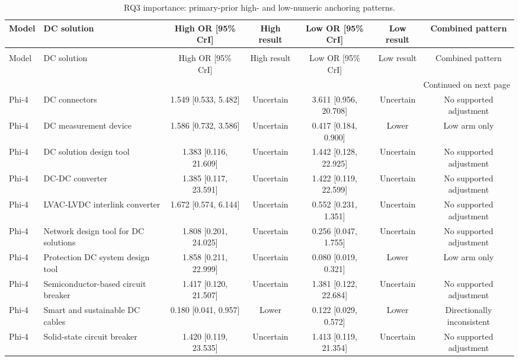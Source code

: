\begin{landscape}
\begin{longtable}{llccccc}
\caption{RQ3 importance: primary-prior high- and low-numeric anchoring patterns.} \label{tab:rq3_importance_numeric_patterns_appendix} \\
\toprule
Model & DC solution & High OR [95\% CrI] & High result & Low OR [95\% CrI] & Low result & Combined pattern \\
\midrule
\endfirsthead
\caption[]{RQ3 importance: primary-prior high- and low-numeric anchoring patterns.} \\
\toprule
Model & DC solution & High OR [95\% CrI] & High result & Low OR [95\% CrI] & Low result & Combined pattern \\
\midrule
\endhead
\midrule
\multicolumn{7}{r}{Continued on next page} \\
\midrule
\endfoot
\bottomrule
\endlastfoot
Phi-4 & DC connectors & 1.549 [0.533, 5.482] & Uncertain & 3.611 [0.956, 20.708] & Uncertain & No supported adjustment \\
Phi-4 & DC measurement device & 1.586 [0.732, 3.586] & Uncertain & 0.417 [0.184, 0.900] & Lower & Low arm only \\
Phi-4 & DC solution design tool & 1.383 [0.116, 21.609] & Uncertain & 1.442 [0.128, 22.925] & Uncertain & No supported adjustment \\
Phi-4 & DC-DC converter & 1.385 [0.117, 23.591] & Uncertain & 1.422 [0.119, 22.599] & Uncertain & No supported adjustment \\
Phi-4 & LVAC-LVDC interlink converter & 1.672 [0.574, 6.144] & Uncertain & 0.552 [0.231, 1.351] & Uncertain & No supported adjustment \\
Phi-4 & Network design tool for DC solutions & 1.808 [0.201, 24.025] & Uncertain & 0.256 [0.047, 1.755] & Uncertain & No supported adjustment \\
Phi-4 & Protection DC system design tool & 1.858 [0.211, 22.999] & Uncertain & 0.080 [0.019, 0.321] & Lower & Low arm only \\
Phi-4 & Semiconductor-based circuit breaker & 1.417 [0.120, 21.507] & Uncertain & 1.381 [0.122, 22.684] & Uncertain & No supported adjustment \\
Phi-4 & Smart and sustainable DC cables & 0.180 [0.041, 0.957] & Lower & 0.122 [0.029, 0.572] & Lower & Directionally inconsistent \\
Phi-4 & Solid-state circuit breaker & 1.420 [0.119, 23.535] & Uncertain & 1.413 [0.119, 21.354] & Uncertain & No supported adjustment \\

\end{longtable}
\end{landscape}
